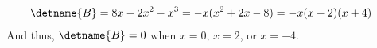 %
\begin{align*}
\detname{B} 
&= 8x -2x^2 - x^3
= -x(x^2 + 2x - 8)
= -x(x-2)(x+4)
\end{align*}
%
And thus, $\detname{B}=0$ when $x = 0$, $x = 2$, or $x = -4$.